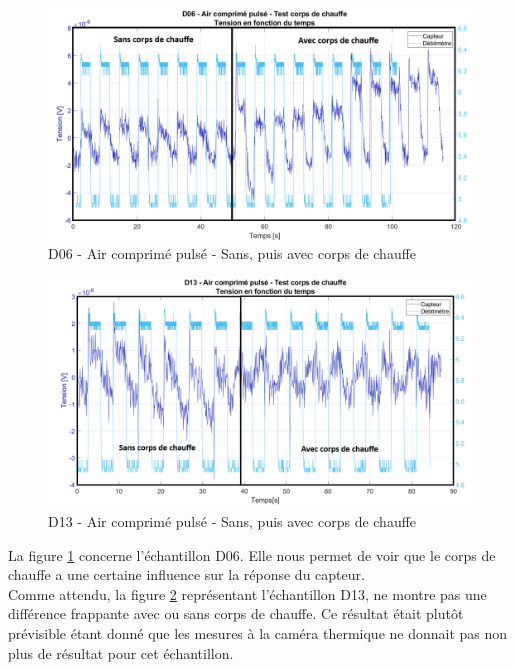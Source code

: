 \begin{figure}[H]
    \centering
    \includegraphics[scale = 0.51]{assets/figures/D06_air_pulse_test_cdc.png}
    \caption{D06 - Air comprimé pulsé - Sans, puis avec corps de chauffe}
    \label{fig:d06_test_cdc}
\end{figure}

\begin{figure}[H]
    \centering
    \includegraphics[scale = 0.5]{assets/figures/D13_air_comprime_pulse_test_cdc.png}
    \caption{D13 - Air comprimé pulsé - Sans, puis avec corps de chauffe}
    \label{fig:d13_test_cdc}
\end{figure}

La figure \ref{fig:d06_test_cdc} concerne l'échantillon D06. Elle nous permet de voir que le corps de chauffe a une certaine influence sur la réponse du capteur. \\
Comme attendu, la figure \ref{fig:d13_test_cdc} représentant l'échantillon D13, ne montre pas une différence frappante avec ou sans corps de 
chauffe. Ce résultat était plutôt prévisible étant donné que les mesures à la caméra thermique ne donnait pas non plus de résultat pour cet 
échantillon. \\


